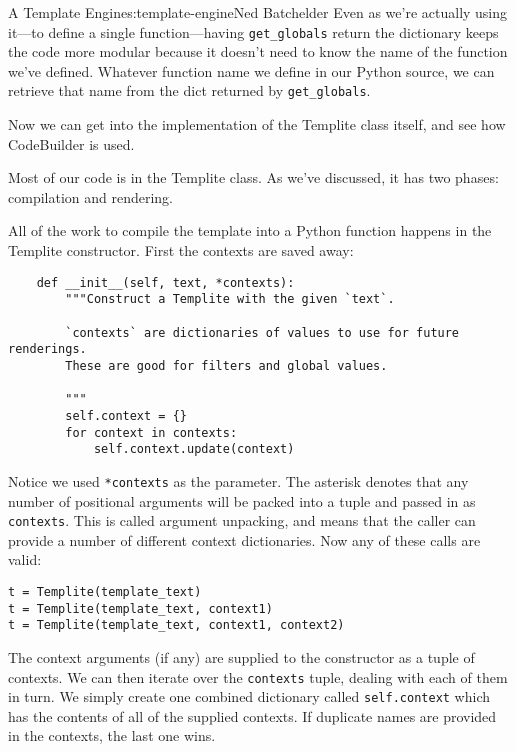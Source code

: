 \begin{aosachapter}{A Template Engine}{s:template-engine}{Ned Batchelder}
Even as we're actually using it---to define a single function---having
\texttt{get\_globals} return the dictionary keeps the code more modular
because it doesn't need to know the name of the function we've defined.
Whatever function name we define in our Python source, we can retrieve
that name from the dict returned by \texttt{get\_globals}.

Now we can get into the implementation of the Templite class itself, and
see how CodeBuilder is used.

\label{the-templite-class-implementation}

Most of our code is in the Templite class. As we've discussed, it has
two phases: compilation and rendering.

\label{compiling}

All of the work to compile the template into a Python function happens
in the Templite constructor. First the contexts are saved away:

\begin{verbatim}
    def __init__(self, text, *contexts):
        """Construct a Templite with the given `text`.

        `contexts` are dictionaries of values to use for future renderings.
        These are good for filters and global values.

        """
        self.context = {}
        for context in contexts:
            self.context.update(context)
\end{verbatim}

Notice we used \texttt{*contexts} as the parameter. The asterisk denotes
that any number of positional arguments will be packed into a tuple and
passed in as \texttt{contexts}. This is called argument unpacking, and
means that the caller can provide a number of different context
dictionaries. Now any of these calls are valid:

\begin{verbatim}
t = Templite(template_text)
t = Templite(template_text, context1)
t = Templite(template_text, context1, context2)
\end{verbatim}

The context arguments (if any) are supplied to the constructor as a
tuple of contexts. We can then iterate over the \texttt{contexts} tuple,
dealing with each of them in turn. We simply create one combined
dictionary called \texttt{self.context} which has the contents of all of
the supplied contexts. If duplicate names are provided in the contexts,
the last one wins.


\end{aosachapter}
